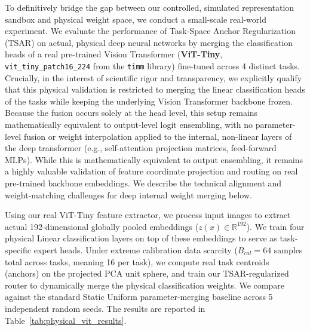 To definitively bridge the gap between our controlled, simulated representation sandbox and
physical weight space, we conduct a small-scale real-world experiment. We evaluate the performance
of Task-Space Anchor Regularization (TSAR) on actual, physical deep neural networks by merging the
classification heads of a real pre-trained Vision Transformer (\textbf{ViT-Tiny},
\texttt{vit\_tiny\_patch16\_224} from the \texttt{timm} library) fine-tuned across 4 distinct tasks.
Crucially, in the interest of scientific rigor and transparency, we explicitly qualify that this physical
validation is restricted to merging the linear classification heads of the tasks while keeping the
underlying Vision Transformer backbone frozen. Because the fusion occurs solely at the head level, this
setup remains mathematically equivalent to output-level logit ensembling, with no parameter-level fusion
or weight interpolation applied to the internal, non-linear layers of the deep transformer (e.g.,
self-attention projection matrices, feed-forward MLPs). While this is mathematically equivalent to
output ensembling, it remains a highly valuable validation of feature coordinate projection and routing on
real pre-trained backbone embeddings. We describe the technical alignment and weight-matching challenges
for deep internal weight merging below.

Using our real ViT-Tiny feature extractor, we process input images to extract actual
192-dimensional globally pooled embeddings ($z(x) \in \mathbb{R}^{192}$). We train four physical
Linear classification layers on top of these embeddings to serve as task-specific expert heads.
Under extreme calibration data scarcity ($B_{cal} = 64$ samples total across tasks, meaning 16 per
task), we compute real task centroids (anchors) on the projected PCA unit sphere, and train our
TSAR-regularized router to dynamically merge the physical classification weights. We compare against
the standard Static Uniform parameter-merging baseline across 5 independent random seeds. The
results are reported in Table~\ref{tab:physical_vit_results}.

